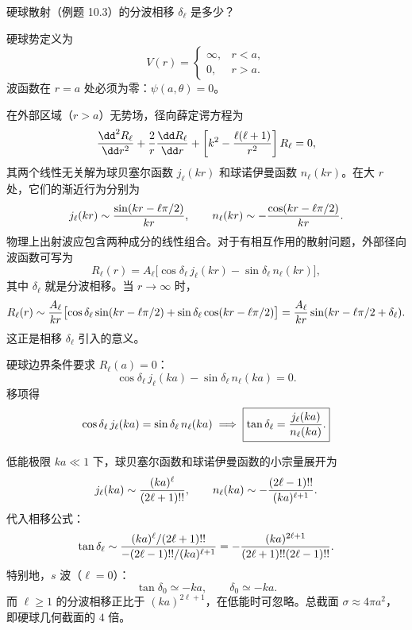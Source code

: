 \begin{question}
硬球散射（例题 10.3）的分波相移 $\delta_\ell$ 是多少？
\end{question}
\begin{solution}
硬球势定义为
\[
V(r)=\begin{cases}
\infty,& r<a,\\
0,& r>a.
\end{cases}
\]
波函数在 $r=a$ 处必须为零：$\psi(a,\theta)=0$。

在外部区域（$r>a$）无势场，径向薛定谔方程为
\[
{\dd^2R_\ell\over\dd r^2}+{2\over r}{\dd R_\ell\over\dd r}+\left[k^2-{\ell(\ell+1)\over r^2}\right]R_\ell=0,
\]
其两个线性无关解为球贝塞尔函数 $j_\ell(kr)$ 和球诺伊曼函数 $n_\ell(kr)$。在大 $r$ 处，它们的渐近行为分别为
\[
j_\ell(kr)\sim{\sin(kr-\ell\pi/2)\over kr},\qquad
n_\ell(kr)\sim-{\cos(kr-\ell\pi/2)\over kr}.
\]
物理上出射波应包含两种成分的线性组合。对于有相互作用的散射问题，外部径向波函数可写为
\[
R_\ell(r)=A_\ell\bigl[\cos\delta_\ell\,j_\ell(kr)-\sin\delta_\ell\,n_\ell(kr)\bigr],
\]
其中 $\delta_\ell$ 就是分波相移。当 $r\to\infty$ 时，
\[
R_\ell(r)\sim{A_\ell\over kr}\bigl[\cos\delta_\ell\sin(kr-\ell\pi/2)+\sin\delta_\ell\cos(kr-\ell\pi/2)\bigr]
={A_\ell\over kr}\sin(kr-\ell\pi/2+\delta_\ell).
\]
这正是相移 $\delta_\ell$ 引入的意义。

硬球边界条件要求 $R_\ell(a)=0$：
\[
\cos\delta_\ell\,j_\ell(ka)-\sin\delta_\ell\,n_\ell(ka)=0.
\]
移项得
\[
\cos\delta_\ell\,j_\ell(ka)=\sin\delta_\ell\,n_\ell(ka)
\;\Longrightarrow\;
\boxed{\tan\delta_\ell={j_\ell(ka)\over n_\ell(ka)}.}
\]

低能极限 $ka\ll1$ 下，球贝塞尔函数和球诺伊曼函数的小宗量展开为
\[
j_\ell(ka)\sim{(ka)^\ell\over(2\ell+1)!!},\qquad
n_\ell(ka)\sim-{(2\ell-1)!!\over(ka)^{\ell+1}}.
\]
代入相移公式：
\[
\tan\delta_\ell\sim{(ka)^\ell/(2\ell+1)!!\over-(2\ell-1)!!/(ka)^{\ell+1}}
=-{(ka)^{2\ell+1}\over(2\ell+1)!!(2\ell-1)!!}.
\]
特别地，$s$ 波（$\ell=0$）：
\[
\tan\delta_0\simeq -ka,\qquad\boxed{\delta_0\simeq -ka.}
\]
而 $\ell\ge1$ 的分波相移正比于 $(ka)^{2\ell+1}$，在低能时可忽略。总截面 $\sigma\approx 4\pi a^2$，即硬球几何截面的 $4$ 倍。
\end{solution}

